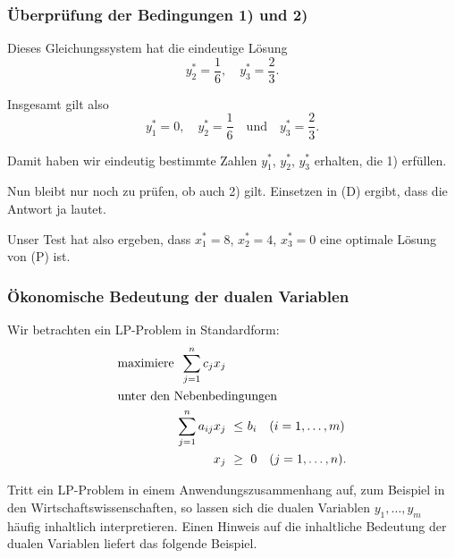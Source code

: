 \documentclass[smaller]{beamer}
\begin{document}
\begin{frame}
 \frametitle{Überprüfung der Bedingungen 1) und 2)}
 Dieses Gleichungssystem hat die eindeutige Lösung 
\[
y_2^* = \frac{1}{6}, \quad
y_3^* = \frac{2}{3}.
\]

Insgesamt gilt also
\[
y_1^* = 0, \quad
y_2^* = \frac{1}{6} \quad \text{und} \quad
y_3^* = \frac{2}{3}.
\]

Damit haben wir eindeutig bestimmte Zahlen $y_1^*$, $y_2^*$, $y_3^*$ erhalten, die 1) erfüllen. \\ \vspace*{0.2cm}

\alert{Nun bleibt nur noch zu prüfen, ob auch 2) gilt.} Einsetzen in (D) ergibt, dass die Antwort ja lautet. \\ \vspace*{0.2cm}

Unser Test hat also ergeben, dass $x_1^*=8$, $x_2^*=4$, $x_3^*=0$ eine optimale Lösung von (P) ist.
\end{frame}

\begin{frame}
 \frametitle{Ökonomische Bedeutung der dualen Variablen}
 Wir betrachten ein LP-Problem in Standardform:
\begin{align}
\begin{alignedat}{4}
\label{eq:7:17}
& \text{maximiere } & \sum\limits_{j=1}^{n}{c_jx_j} & & & \\
& \rlap{unter den Nebenbedingungen} & & & & \\
&& \sum\limits_{j=1}^{n}{a_{ij}x_j} &\ \leq &\ b_i & \quad (i=1,\ldots,m) \\
&&                              x_j &\ \geq &\   0 & \quad (j=1,\ldots,n).
\end{alignedat}
\end{align}

Tritt ein LP-Problem in einem Anwendungszusammenhang auf, zum Beispiel in den Wirtschaftswissenschaften, so \alert{lassen sich die dualen Variablen $y_1,\ldots,y_m$ häufig inhaltlich interpretieren}. Einen Hinweis auf die inhaltliche Bedeutung der dualen Variablen liefert das folgende Beispiel.
\end{frame}
\end{document}
